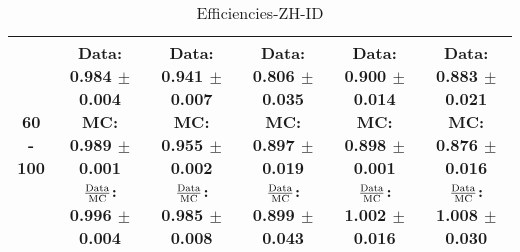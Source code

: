 \documentclass[final,letterpaper,twoside,12pt]{article}
\begin{document}
\begin{table}[htbp]
\begin{adjustwidth}{-4em}{-4em}
\begin{tabular}{|c|c|c|c|c|c|}
60 - 100 & \parbox[c]{1.1 in}{ \scriptsize  Data: 0.984 $\pm$ 0.004 \newline MC: 0.989 $\pm$ 0.001 \newline $\frac{\rm{Data}}{\rm{MC}}$: 0.996 $\pm$ 0.004} & \parbox[c]{1.1 in}{ \scriptsize  Data: 0.941 $\pm$ 0.007 \newline MC: 0.955 $\pm$ 0.002 \newline $\frac{\rm{Data}}{\rm{MC}}$: 0.985 $\pm$ 0.008} & \parbox[c]{1.1 in}{ \scriptsize  Data: 0.806 $\pm$ 0.035 \newline MC: 0.897 $\pm$ 0.019 \newline $\frac{\rm{Data}}{\rm{MC}}$: 0.899 $\pm$ 0.043} & \parbox[c]{1.1 in}{ \scriptsize  Data: 0.900 $\pm$ 0.014 \newline MC: 0.898 $\pm$ 0.001 \newline $\frac{\rm{Data}}{\rm{MC}}$: 1.002 $\pm$ 0.016} & \parbox[c]{1.1 in}{ \scriptsize  Data: 0.883 $\pm$ 0.021 \newline MC: 0.876 $\pm$ 0.016 \newline $\frac{\rm{Data}}{\rm{MC}}$: 1.008 $\pm$ 0.030}\\ \hline 
\end{tabular}
\caption {Efficiencies-ZH-ID}
\label{tab:cqdata0}
\end{adjustwidth}\end{table}
\end{document}
